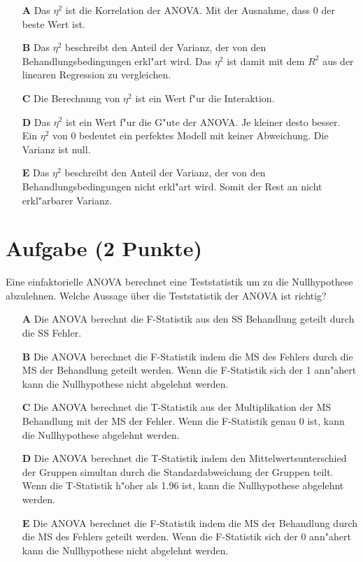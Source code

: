 \documentclass[a4paper, 9pt]{scrartcl}\usepackage[]{graphicx}\usepackage[]{xcolor}
\begin{document}
\begin{enumerate}
\item [\textbf{A} \msquare] Das $\eta^2$ ist die Korrelation der ANOVA. Mit der Ausnahme, dass 0 der beste Wert ist.
\item [\textbf{B} \msquare] Das $\eta^2$ beschreibt den Anteil der Varianz, der von den Behandlungsbedingungen erkl{"a}rt wird. Das $\eta^2$ ist damit mit dem $R^2$ aus der linearen Regression zu vergleichen.
\item [\textbf{C} \msquare] Die Berechnung von $\eta^2$ ist ein Wert f{"u}r die Interaktion.
\item [\textbf{D} \msquare] Das $\eta^2$ ist ein Wert f{"u}r die G{"u}te der ANOVA. Je kleiner desto besser. Ein $\eta^2$ von 0 bedeutet ein perfektes Modell mit keiner Abweichung. Die Varianz ist null.
\item [\textbf{E} \msquare] Das $\eta^2$ beschreibt den Anteil der Varianz, der von den Behandlungsbedingungen nicht erkl{"a}rt wird. Somit der Rest an nicht erkl{"a}rbarer Varianz.
\end{enumerate} 

\section{Aufgabe \hfill (2 Punkte)}

Eine einfaktorielle ANOVA berechnet eine Teststatistik um zu die Nullhypothese abzulehnen. Welche Aussage {\"u}ber die Teststatistik der ANOVA ist richtig?



\begin{enumerate}
\item [\textbf{A} \msquare] Die ANOVA berechnt die F-Statistik aus den SS Behandlung geteilt durch die SS Fehler.
\item [\textbf{B} \msquare] Die ANOVA berechnet die F-Statistik indem die MS des Fehlers durch die MS der Behandlung geteilt werden. Wenn die F-Statistik sich der 1 ann{"a}hert kann die Nullhypothese nicht abgelehnt werden.
\item [\textbf{C} \msquare] Die ANOVA berechnet die T-Statistik aus der Multiplikation der MS Behandlung mit der MS der Fehler. Wenn die F-Statistik genau 0 ist, kann die Nullhypothese abgelehnt werden.
\item [\textbf{D} \msquare] Die ANOVA berechnet die T-Statistik indem den Mittelwertsunterschied der Gruppen simultan durch die Standardabweichung der Gruppen teilt. Wenn die T-Statistik h{"o}her als 1.96 ist, kann die Nullhypothese abgelehnt werden.
\item [\textbf{E} \msquare] Die ANOVA berechnet die F-Statistik indem die MS der Behandlung durch die MS des Fehlers geteilt werden. Wenn die F-Statistik sich der 0 ann{"a}hert kann die Nullhypothese nicht abgelehnt werden.
\end{enumerate} 
\end{document}

